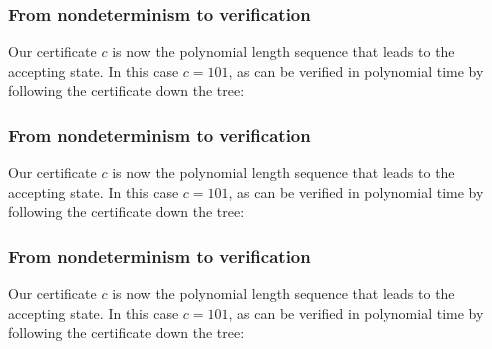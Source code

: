 \documentclass[aspectratio=169]{beamer}
\begin{document}
\begin{frame}[noframenumbering]
\frametitle{From nondeterminism to verification}
Our certificate $c$ is now the polynomial length sequence that leads to the accepting state. In this case $c=101$, as can be verified in polynomial time by following the certificate down the tree:
\begin{center}
\end{center}
\end{frame}

\begin{frame}[noframenumbering]
\frametitle{From nondeterminism to verification}
Our certificate $c$ is now the polynomial length sequence that leads to the accepting state. In this case $c=101$, as can be verified in polynomial time by following the certificate down the tree:
\begin{center}
\end{center}
\end{frame}

\begin{frame}[noframenumbering]
\frametitle{From nondeterminism to verification}
Our certificate $c$ is now the polynomial length sequence that leads to the accepting state. In this case $c=101$, as can be verified in polynomial time by following the certificate down the tree:
\begin{center}
\end{center}
\end{frame}
\end{document}
